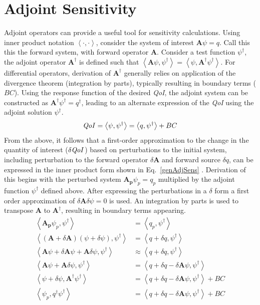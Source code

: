 \documentclass[12pt]{report}
\newcommand{\bra}{\left\langle}
\newcommand{\ket}{\right\rangle}
\newcommand{\qoi}{{\it QoI}\xspace}
\begin{document}
\section{Adjoint Sensitivity}

Adjoint operators can provide a useful tool for sensitivity calculations. Using inner product 
notation $\bra \cdot , \cdot \ket$, consider the system of interest $\mathbf{A} \psi = q$. Call this this 
the forward system, with forward operator $\mathbf{A}$. Consider a test function $\psi^\dag$, the 
adjoint operator $\mathbf{A^\dag}$ is defined such that $\bra \mathbf{A} \psi, \psi^\dag \ket = \bra \psi, 
\mathbf{A^\dag} \psi^\dag \ket $. For differential operators, derivation of $\mathbf{A^\dag}$ generally relies on 
application of the divergence theorem (integration by parts), typically resulting in boundary 
terms ($BC$). Using the response function of the desired \qoi, the adjoint system can be constructed 
as $\mathbf{A^\dag} \psi^\dag = q^\dag$, leading to an alternate expression of the \qoi using the 
adjoint solution $\psi^\dag $.
\begin{equation}
\label{genAdjQoI}
\qoi = \bra \psi, \psi^\dag \ket = \bra q , \psi^\dag \ket + BC
\end{equation} 
From the above, it follows that a first-order approximation to the change in the quantity of interest ($\delta \qoi$)
based on perturbations to the initial system, including perturbation to the forward 
operator $\delta \mathbf{A}$ and forward source $\delta q$, can be expressed in the inner product form shown in Eq.~\eqref{genAdjSens} \cite{Marchuk}. Derivation of this begins with the perturbed system $\mathbf{A_p} \psi_p = q_p$ multiplied by the adjoint function $\psi^\dag$ defined above. After expressing the perturbations in a $\delta$ form a first order approximation of $\delta \mathbf{A} \delta \psi = 0$ is used. An integration by parts is used to transpose $\mathbf{A}$ to $\mathbf{A^\dag}$, resulting in boundary terms appearing. 
\begin{equation}
\begin{split}
\bra \mathbf{A_p} \psi_p ,\psi^\dag\ket &= \bra q_p ,\psi^\dag \ket \\
\bra \left( \mathbf{A}+\delta \mathbf{A} \right) \left( \psi + \delta \psi \right),\psi^\dag\ket &= \bra q+\delta q ,\psi^\dag \ket \\
\bra \mathbf{A} \psi +\delta \mathbf{A} \psi + \mathbf{A} \delta \psi ,\psi^\dag\ket &\approx \bra q+\delta q ,\psi^\dag \ket \\
\bra \mathbf{A} \psi + \mathbf{A} \delta \psi ,\psi^\dag\ket &= \bra q+\delta q - \delta \mathbf{A} \psi  ,\psi^\dag \ket \\
\bra \psi +\delta \psi , \mathbf{A^\dag} \psi^\dag\ket &= \bra q+\delta q - \delta \mathbf{A} \psi  ,\psi^\dag \ket + BC \\
\bra \psi_p , q^\dag \psi^\dag\ket &= \bra q+\delta q - \delta \mathbf{A} \psi  ,\psi^\dag \ket + BC \\
\end{split}
\end{equation}
\end{document}
